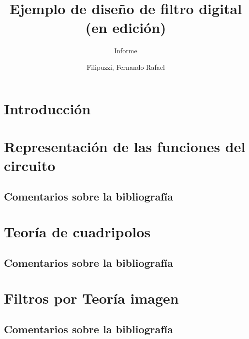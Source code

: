 \documentclass[oneside,a4paper,10pt]{scrbook}
\begin{document}
	\pagestyle{fancy}
	
	\fancyhead{}\fancyfoot{}

	
	\rfoot{ \thepage \hspace{1pt} - \pageref{LastPage}}
	
	\title{Ejemplo de diseño de filtro digital (en edición)}
	\subtitle{Informe}
	\author{Filipuzzi, Fernando Rafael	}
	
	
	\maketitle
	
	\tableofcontents
	
	\listoffigures\newpage
   
%    
    
	\chapter{Introducción}
	{
		
	}
	
	\clearpage	
	
	\chapter{Representación de las funciones del circuito}
	{
		\section{Comentarios sobre la bibliografía}
   		{
    						
		}
	}	
	
    \clearpage	
	
	\chapter{Teoría de cuadripolos}
	{
		\section{Comentarios sobre la bibliografía}
   		{
    						
		}
	}	
	
	\clearpage
	
		
	\chapter{Filtros por Teoría imagen}
	{
		\section{Comentarios sobre la bibliografía}
   		{
    						
		}
	}	
	
\end{document}
